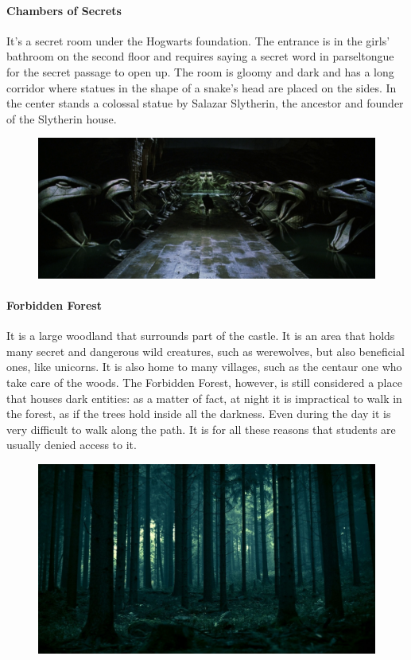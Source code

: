 \paragraph{Chambers of Secrets}
It's a secret room under the Hogwarts foundation. The entrance is in the girls' bathroom on the second floor and requires saying a secret word in parseltongue for the secret passage to open up. The room is gloomy and dark and has a long corridor where statues in the shape of a snake's head are placed on the sides. In the center stands a colossal statue by Salazar Slytherin, the ancestor and founder of the Slytherin house.  
\begin{figure}[H]
\includegraphics[max width=\textwidth]{../Pictures/Locations/Hogwarts/Chamber_Secrets_picture.png} 
\end{figure}

\paragraph{Forbidden Forest}
It is a large woodland that surrounds part of the castle. It is an area that holds many secret and dangerous wild creatures, such as werewolves, but also beneficial ones, like unicorns. It is also home to many villages, such as the centaur one who take care of the woods. The Forbidden Forest, however, is still considered a place that houses dark entities: as a matter of fact, at night it is impractical to walk in the forest, as if the trees hold inside all the darkness. Even during the day it is very difficult to walk along the path. It is for all these reasons that students are usually denied access to it. 
\begin{figure}[H]
\includegraphics[max width=\textwidth]{../Pictures/Locations/Hogwarts/Forbidden_Forest_picture.jpg} 
\end{figure}


